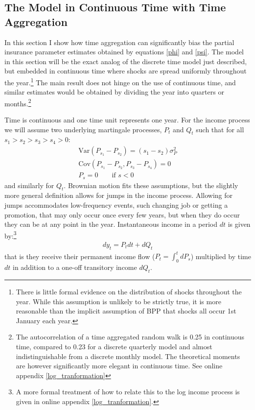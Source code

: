 \documentclass[AER]{AEA}
\begin{document}
\subsection{The Model in Continuous Time with Time Aggregation}
In this section I show how time aggregation can significantly bias the partial insurance parameter estimates obtained by equations \ref{phi} and \ref{psi}. The model in this section will be the exact analog of the discrete time model just described, but embedded in continuous time where shocks are spread uniformly throughout the year.\footnote{There is little formal evidence on the distribution of shocks throughout the year. While this assumption is unlikely to be strictly true, it is more reasonable than the implicit assumption of BPP that shocks all occur 1st January each year.} The main result does not hinge on the use of continuous time, and similar estimates would be obtained by dividing the year into quarters or months.\footnote{The autocorrelation of a time aggregated random walk is 0.25 in continuous time, compared to 0.23 for a discrete quarterly model and almost indistinguishable from a discrete monthly model. The theoretical moments are however significantly more elegant in continuous time. See online appendix \ref{log_tranformation}}

Time is continuous and one time unit represents one year. For the income process we will assume two underlying martingale processes, $P_t$ and $Q_t$ such that for all $s_1>s_2>s_3>s_4>0$:
\begin{align*}
\mathrm{Var}(P_{s_1}-P_{s_2})=(s_1-s_2)\sigma_P^2 \\
\mathrm{Cov}(P_{s_1}-P_{s_2},P_{s_3}-P_{s_4}) = 0 \\
P_s = 0 \qquad \text{if } s<0
\end{align*}
and similarly for $Q_t$. Brownian motion fits these assumptions, but the slightly more general definition allows for jumps in the income process. Allowing for jumps accommodates low-frequency events, such changing job or getting a promotion, that may only occur once every few years, but when they do occur they can be at any point in the year. Instantaneous income in a period $dt$ is given by:\footnote{A more formal treatment of how to relate this to the log income process is given in online appendix \ref{log_tranformation}.}
\begin{align}
dy_t = P_t dt  +dQ_t \label{income_process}
\end{align}
that is they receive their permanent income flow ($P_t =\int_{0}^{t}dP_s $) multiplied by time $dt$ in addition to a one-off transitory income $dQ_t$.
\end{document}
